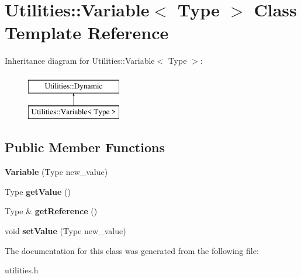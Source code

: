 \hypertarget{classUtilities_1_1Variable}{}\section{Utilities\+:\+:Variable$<$ Type $>$ Class Template Reference}
\label{classUtilities_1_1Variable}
Inheritance diagram for Utilities\+:\+:Variable$<$ Type $>$\+:\begin{figure}[H]
\begin{center}
\leavevmode
\includegraphics[height=2.000000cm]{classUtilities_1_1Variable}
\end{center}
\end{figure}
\subsection*{Public Member Functions}
\begin{DoxyCompactItemize}
\item 
{\bfseries Variable} (Type new\+\_\+value)\hypertarget{classUtilities_1_1Variable_af6f55d5d5c2472b25212828c66b730bc}{}\label{classUtilities_1_1Variable_af6f55d5d5c2472b25212828c66b730bc}

\item 
Type {\bfseries get\+Value} ()\hypertarget{classUtilities_1_1Variable_a2531a59e087062fab302cf487b6bdfa2}{}\label{classUtilities_1_1Variable_a2531a59e087062fab302cf487b6bdfa2}

\item 
Type \& {\bfseries get\+Reference} ()\hypertarget{classUtilities_1_1Variable_aec9b6becdc76afca1635280ab81ac41d}{}\label{classUtilities_1_1Variable_aec9b6becdc76afca1635280ab81ac41d}

\item 
void {\bfseries set\+Value} (Type new\+\_\+value)\hypertarget{classUtilities_1_1Variable_af218f1c4f50cbb2f69cc66e8150e05b3}{}\label{classUtilities_1_1Variable_af218f1c4f50cbb2f69cc66e8150e05b3}

\end{DoxyCompactItemize}


The documentation for this class was generated from the following file\+:\begin{DoxyCompactItemize}
\item 
utilities.\+h\end{DoxyCompactItemize}
